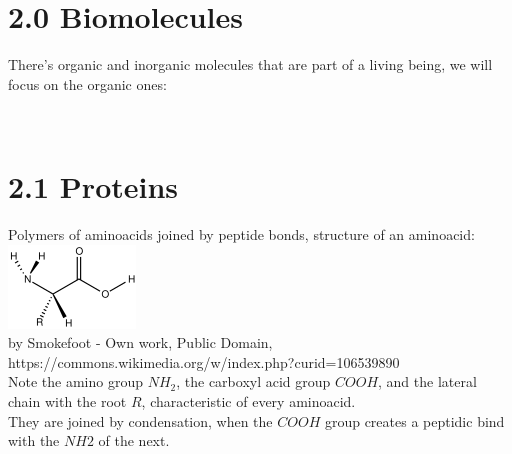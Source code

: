 \documentclass[a4paper,landscape,10pt]{cheatsheet}
\begin{document}
\section{2.0 Biomolecules}
There's organic and inorganic molecules that are part of a living being, we will focus on the organic ones:

\hfill\\
\section*{2.1 Proteins}
Polymers of aminoacids joined by peptide bonds, structure of an aminoacid:
\includegraphics{images/amino_acid_structure}\\
{\footnotesize by Smokefoot - Own work, Public Domain, https://commons.wikimedia.org/w/index.php?curid=106539890}\\
Note the amino group $NH_2$, the carboxyl acid group $COOH$, and the lateral chain with the root $R$, characteristic of
every aminoacid.\\
They are joined by condensation, when the $COOH$ group creates a peptidic bind with the $NH2$ of the next.

\hfill\\
\end{document}
